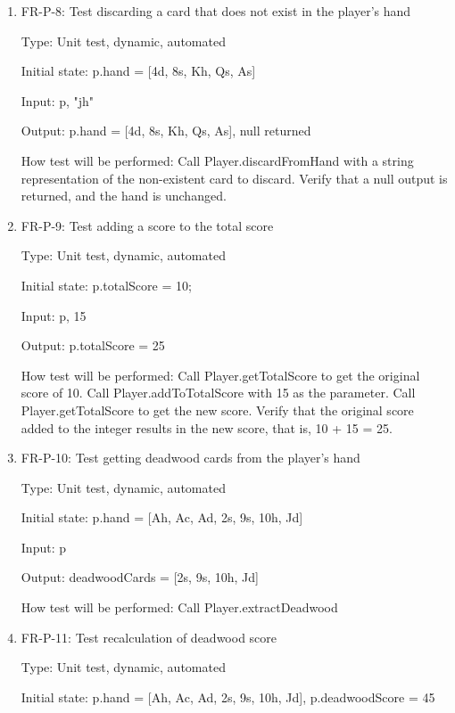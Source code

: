 \documentclass[12pt, titlepage]{article}
\begin{document}
\begin{enumerate}
    \item{FR-P-8: Test discarding a card that does not exist in the player's hand\\}
    
    Type: Unit test, dynamic, automated
    					
    Initial state: p.hand = [4d, 8s, Kh, Qs, As]
    
    Input: p, "jh"
    
    Output: p.hand = [4d, 8s, Kh, Qs, As], null returned
    
    How test will be performed: Call Player.discardFromHand with a string representation of the non-existent card to discard. Verify that a null output is returned, and the hand is unchanged.
    
    \item{FR-P-9: Test adding a score to the total score\\}
    
    Type: Unit test, dynamic, automated
    					
    Initial state: p.totalScore = 10;
    
    Input: p, 15
    
    Output: p.totalScore = 25
    
    How test will be performed: Call Player.getTotalScore to get the original score of 10. Call Player.addToTotalScore with 15 as the parameter. Call Player.getTotalScore to get the new score. Verify that the original score added to the integer results in the new score, that is, 10 + 15 = 25.
    
    \item{FR-P-10: Test getting deadwood cards from the player's hand\\}
    
    Type: Unit test, dynamic, automated
    					
    Initial state: p.hand = [Ah, Ac, Ad, 2s, 9s, 10h, Jd]
    
    Input: p
    
    Output: deadwoodCards = [2s, 9s, 10h, Jd]
    
    How test will be performed: Call Player.extractDeadwood
    
    \item{FR-P-11: Test recalculation of deadwood score\\}
    
    Type: Unit test, dynamic, automated
    					
    Initial state: p.hand = [Ah, Ac, Ad, 2s, 9s, 10h, Jd], p.deadwoodScore = 45
    

\end{enumerate}
\end{document}
